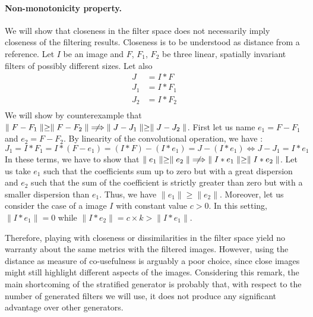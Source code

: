 \documentclass[a4paper]{report}
\begin{document}
			\paragraph{Non-monotonicity property.}
			We will show that closeness in the filter space does not necessarily imply closeness of the filtering results. Closeness is to be understood as distance from a reference.
			Let $I$ be an image and $F$, $F_1$, $F_2$ be three linear, spatially invariant filters of possibly different sizes. Let also
			\begin{align*}
				J &= I * F \\
				J_1 &= I * F_1 \\
				J_2 &= I * F_2 \\
			\end{align*}
			We will show by counterexample that $\parallel F - F_1 \parallel \geq \parallel F - F_2 \parallel \centernot\implies \parallel J - J_1 \parallel \geq \parallel J - J_2 \parallel$.
			First let us name $e_1 = F - F_1$ and $e_2 = F - F_2$. By linearity of the convolutional operation, we have :
			\[
				J_1 = I * F_1 =  I * (F - e_1) = (I * F) - (I * e_1) = J - (I * e_1)
				\iff
				J - J_1 = I * e_1
			\]
			In these terms, we have to show that $\parallel e_1 \parallel \geq \parallel e_2 \parallel \centernot\implies \parallel I * e_1 \parallel \geq \parallel I * e_2 \parallel$. 
			Let us take $e_1$ such that the coefficients sum up to zero but with a great dispersion and $e_2$ such that the sum of the coefficient is strictly greater than zero but with a smaller dispersion than $e_1$. Thus, we have  $\parallel e_1 \parallel \geq \parallel e_2 \parallel$. Moreover, let us consider the case of a image $I$ with constant value $c > 0$. In this setting, $\parallel I * e_1 \parallel = 0$ while $\parallel I * e_2 \parallel = c \times k > \parallel I * e_1 \parallel$.
			\par
			Therefore, playing with closeness or dissimilarities in the filter space yield no warranty about the same metrics with the filtered images. However, using the distance as measure of co-usefulness is arguably a poor choice, since close images might still highlight different aspects of the images. Considering this remark, the main shortcoming of the stratified generator is probably that, with respect to the number of generated filters we will use, it  does not produce any significant advantage over other generators.
			
			
			
			
			
			
			
\end{document}
